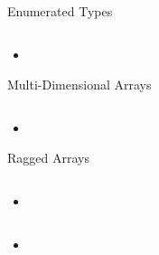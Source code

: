\documentclass{beamer}
\begin{document}
\begin{frame}[fragile]{Enumerated Types}


\begin{lstlisting}[language=Java]

\end{lstlisting}

\begin{itemize}
\item
\end{itemize}


\end{frame}

\begin{frame}[fragile]{Multi-Dimensional Arrays}


\begin{lstlisting}[language=Java]

\end{lstlisting}

\begin{itemize}
\item
\end{itemize}


\end{frame}

\begin{frame}[fragile]{Ragged Arrays}


\begin{lstlisting}[language=Java]

\end{lstlisting}

\begin{itemize}
\item
\end{itemize}


\end{frame}

\begin{frame}[fragile]{}


\begin{lstlisting}[language=Java]

\end{lstlisting}

\begin{itemize}
\item
\end{itemize}


\end{frame}
\end{document}
